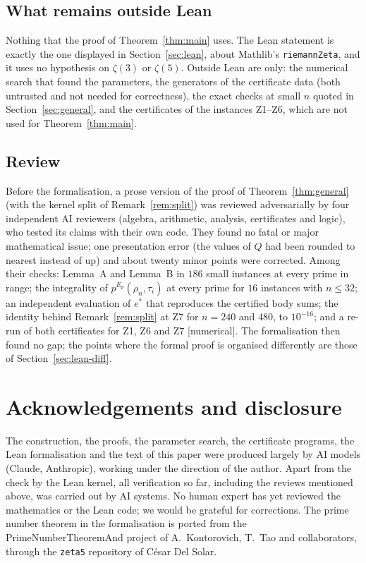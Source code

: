 \documentclass[11pt]{amsart}
\theoremstyle{definition}
\theoremstyle{remark}
\numberwithin{equation}{section}
\newcommand{\lean}[1]{{\def\_{\textunderscore\allowbreak}\texttt{#1}}}
\begin{document}
\subsection{What remains outside Lean}
Nothing that the proof of Theorem~\ref{thm:main} uses. The Lean statement is exactly the one displayed in
Section~\ref{sec:lean}, about Mathlib's \lean{riemannZeta}, and it uses no hypothesis on $\zeta(3)$ or $\zeta(5)$.
Outside Lean are only: the numerical search that found the parameters, the generators of the certificate data (both
untrusted and not needed for correctness), the exact checks at small $n$ quoted in Section~\ref{sec:general}, and the
certificates of the instances Z1--Z6, which are not used for Theorem~\ref{thm:main}.

\subsection{Review}
Before the formalisation, a prose version of the proof of Theorem~\ref{thm:general} (with the kernel split of
Remark~\ref{rem:split}) was reviewed adversarially by four independent AI reviewers (algebra, arithmetic, analysis, certificates and logic), who tested its claims with their
own code. They found no fatal or major mathematical issue; one presentation error (the values of $Q$ had been rounded
to nearest instead of up) and about twenty minor points were corrected. Among their checks: Lemma~A and Lemma~B in
$186$ small instances at every prime in range; the integrality of $p^{E_p}(\rho_n,\tau_i)$ at every prime for $16$
instances with $n\le32$; an independent evaluation of $e^*$ that reproduces the certified body sums; the identity
behind Remark~\ref{rem:split} at Z7 for $n=240$ and $480$, to $10^{-16}$; and a re-run of both certificates for
Z1, Z6 and Z7 [numerical]. The formalisation then found no gap; the points where the formal proof is organised
differently are those of Section~\ref{sec:lean-diff}.

\section*{Acknowledgements and disclosure}
The construction, the proofs, the parameter search, the certificate programs, the Lean formalisation and the text of
this paper were produced largely by AI models (Claude, Anthropic), working under the direction of the author. Apart
from the check by the Lean kernel, all verification so far, including the reviews mentioned above, was carried out by
AI systems. No human expert has yet reviewed the mathematics or the Lean code; we would be grateful for corrections.
The prime number theorem in the formalisation is ported from the PrimeNumberTheoremAnd project of A.~Kontorovich,
T.~Tao and collaborators, through the \lean{zeta5} repository of C\'esar Del Solar.



\end{document}

